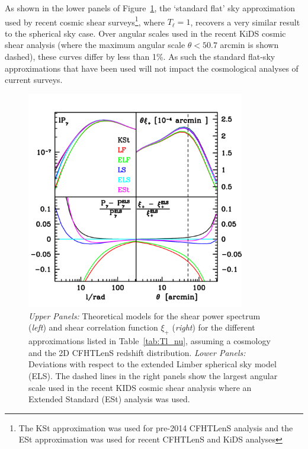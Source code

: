 As shown in the lower panels of Figure~\ref{fig:Cl_xi}, the `standard flat' sky approximation used by recent cosmic shear surveys\footnote{The KSt approximation was used for pre-2014 CFHTLenS analysis and the ESt approximation was used for recent CFHTLenS and KiDS analyses}, where $T_\ell = 1$, recovers a very similar result to the spherical sky case.  Over angular scales used in the recent KiDS cosmic shear analysis (where the maximum angular scale $\theta<50.7$ arcmin is shown dashed), these curves differ by less than 1\%.  As such the standard flat-sky approximations that have been used will not impact the cosmological analyses of current surveys.
 
 \begin{figure}
 \begin{center}
 \includegraphics[width=0.85\textwidth]{figures/Cl_xi_comp.pdf}
 \caption{ \label{fig:Cl_xi}\emph{Upper Panels:} Theoretical models for the shear power spectrum (\emph{left}) and shear correlation function $\xi_+$ (\emph{right}) for the different approximations listed in Table~\ref{tab:Tl_nu}, assuming a \citet{planck/cosmo:2015} cosmology and the 2D CFHTLenS redshift distribution. \emph{Lower Panels:} Deviations with respect to the extended Limber spherical sky model (ELS).    The dashed lines in the right panels show the largest angular scale used in the recent KIDS cosmic shear analysis where an Extended Standard (ESt) analysis was used.}
 \end{center}
 \end{figure}
 
